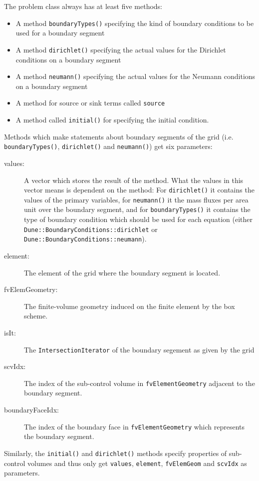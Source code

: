 The problem class always has at least five methods:
\begin{itemize}
\item A method \texttt{boundaryTypes()} specifying the kind of
  boundary conditions to be used for a boundary segment
\item A method \texttt{dirichlet()} specifying the actual values for
  the Dirichlet conditions on a boundary segment
\item A method \texttt{neumann()} specifying the actual values for
  the Neumann conditions on a boundary segment
\item A method for source or sink terms called \texttt{source}
\item A method called \texttt{initial()} for specifying the initial
  condition.
\end{itemize}

Methods which make statements about boundary segments of the grid (i.e. 
\texttt{boundaryTypes()}, \texttt{dirichlet()} and \texttt{neumann()}) get 
six parameters:
\begin{description}
\item[values:] A vector which stores the result of the method. What
  the values in this vector means is dependent on the method: For
  \texttt{dirichlet()} it contains the values of the primary
  variables, for \texttt{neumann()} it the mass fluxes per area unit
  over the boundary segment, and for \texttt{boundaryTypes()} it
  contains the type of boundary condition which should be used for
  each equation (either \texttt{Dune::BoundaryConditions::dirichlet} or
  \texttt{Dune::BoundaryConditions::neumann}).
\item[element:] The element of the grid where the boundary segment
  is located.
\item[fvElemGeometry:] The finite-volume geometry induced on the
  finite element by the box scheme.
\item[isIt:] The \texttt{IntersectionIterator} of the boundary
  segement as given by the grid
\item[scvIdx:] The index of the sub-control volume in
  \texttt{fvElementGeometry} adjacent to the boundary segment.
\item[boundaryFaceIdx:] The index of the boundary face in
  \texttt{fvElementGeometry} which represents the boundary segment.  
\end{description}

Similarly, the \texttt{initial()} and \texttt{dirichlet()} methods
specify properties of sub-control volumes and thus only get
\texttt{values}, \texttt{element}, \texttt{fvElemGeom} and
\texttt{scvIdx} as parameters.

